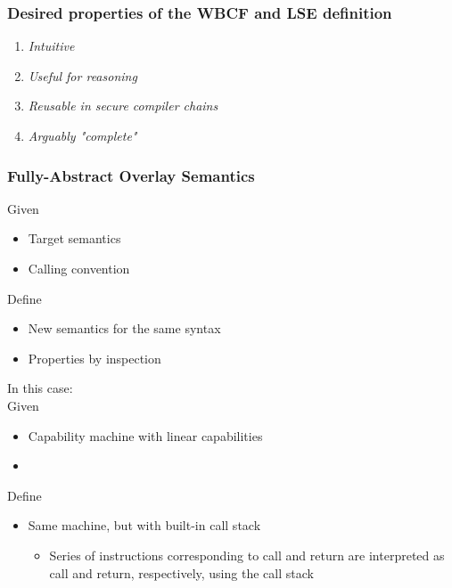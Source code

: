 \documentclass[aspectratio=169]{beamer}
\begin{document}
\begin{frame}
  \frametitle{Desired properties of the WBCF and LSE definition}
  \begin{enumerate}
\item {\itshape Intuitive}%
\item {\itshape Useful for reasoning}%
\item {\itshape Reusable in secure compiler chains}%
\item {\itshape Arguably "complete"}%
\end{enumerate}
\end{frame}

\begin{frame}
  \frametitle{Fully-Abstract Overlay Semantics}
  Given
  \begin{itemize}
  \item Target semantics
  \item Calling convention
  \end{itemize}
  Define
  \begin{itemize}
  \item New semantics for the same syntax
  \item Properties by inspection
  \end{itemize}
  In this case:\\
  Given
  \begin{itemize}
  \item Capability machine with linear capabilities
  \item \stktokens{} 
  \end{itemize}
  Define
  \begin{itemize}
  \item Same machine, but with built-in call stack
    \begin{itemize}
    \item Series of instructions corresponding to call and return are
      interpreted as call and return, respectively, using the call stack
    \end{itemize}
  \end{itemize}
\end{frame}
\end{document}
